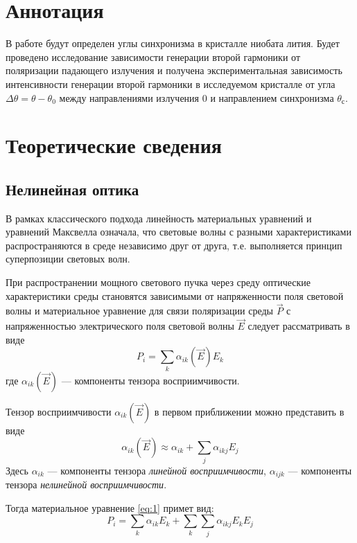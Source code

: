 \documentclass[a4paper, 12pt]{article}
\begin{document}

\section{Аннотация}
В работе будут определен углы синхронизма в кристалле ниобата лития.
Будет проведено исследование зависимости генерации второй гармоники от
поляризации падающего излучения и получена экспериментальная
зависимость интенсивности генерации второй гармоники в исследуемом
кристалле от угла $\Delta \theta = \theta - \theta _{0}$ между
направлениями излучения $0$ и направлением синхронизма $\theta
_{\text{с}}$. 




\section{Теоретические сведения}

\subsection{Нелинейная оптика}

В рамках классического подхода линейность материальных уравнений и
уравнений Максвелла означала, что световые волны с разными
характеристиками распространяются в среде независимо друг от друга,
т.е. выполняется принцип суперпозиции световых волн.

При распространении мощного светового пучка через среду оптические
характеристики среды становятся зависимыми от напряженности поля
световой волны и материальное уравнение для связи поляризации среды
$\vec{P}$ с напряженностью электрического поля световой волны
$\vec{E}$ следует рассматривать в виде 
\begin{equation}
    P_i = \sum\limits_{k} \alpha _{ik}(\vec{E}) E_k
    \label{eq:1}
\end{equation}
где $\alpha _{ik}(\vec{E})$ --- компоненты тензора восприимчивости.

Тензор восприимчивости $\alpha _{ik}(\vec{E})$ в первом приближении
можно представить в виде 
\begin{equation}
    \alpha _{ik}(\vec{E}) \approx \alpha
    _{ik} + \sum\limits_{j}
    \alpha _{ikj} E_j
    \label{eq:2}
\end{equation}
Здесь $\alpha _{ik}$ --- компоненты тензора \emph{линейной
восприимчивости}, $\alpha _{ijk}$ --- компоненты тензора
\emph{нелинейной восприимчивости}.

Тогда материальное уравнение \eqref{eq:1} примет вид:
\begin{equation}
    P _{i} = \sum\limits_{k} \alpha _{ik} E_k +
    \sum\limits_{k}\sum\limits_{j} \alpha _{ikj} E_k E_j
    \label{eq:3}
\end{equation}
\end{document}
